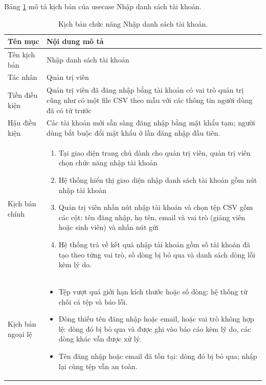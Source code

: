 \documentclass[../BTL.tex]{subfiles}
\begin{document}
Bảng \ref{tab:uc-import-users} mô tả kịch bản của usecase Nhập danh sách tài khoản.
\begin{table}[H]
\centering
\begin{tabularx}{\textwidth}{|p{3.2cm}|X|}
\hline
Tên mục & Nội dung mô tả \\ \hline
Tên kịch bản & Nhập danh sách tài khoản \\ \hline
Tác nhân & Quản trị viên \\ \hline
Tiền điều kiện & Quản trị viên đã đăng nhập bằng tài khoản có vai trò quản trị cũng như có một file CSV theo mẫu với các thông tin người dùng đã có từ trước \\ \hline
Hậu điều kiện & Các tài khoản mới sẵn sàng đăng nhập bằng mật khẩu tạm; người dùng bắt buộc đổi mật khẩu ở lần đăng nhập đầu tiên. \\ \hline
Kịch bản chính &
\begin{enumerate}[leftmargin=*, nosep]
    \item Tại giao diện trang chủ dành cho quản trị viên, quản trị viên chọn chức năng nhập tài khoản
    \item Hệ thống hiển thị giao diện nhập danh sách tài khoản gồm nút nhập tài khoản
    \item Quản trị viên nhấn nút nhập tài khoản và chọn tệp CSV gồm các cột: tên đăng nhập, họ tên, email và vai trò (giảng viên hoặc sinh viên) và nhấn nút gửi
    \item Hệ thống trả về kết quả nhập tài khoản gồm số tài khoản đã tạo theo từng vai trò, số dòng bị bỏ qua và danh sách dòng lỗi kèm lý do.
\end{enumerate} \\ \hline
Kịch bản ngoại lệ &
\begin{itemize}[leftmargin=*, nosep]
    \item Tệp vượt quá giới hạn kích thước hoặc số dòng: hệ thống từ chối cả tệp và báo lỗi.
    \item Dòng thiếu tên đăng nhập hoặc email, hoặc vai trò không hợp lệ: dòng đó bị bỏ qua và được ghi vào báo cáo kèm lý do, các dòng khác vẫn được xử lý.
    \item Tên đăng nhập hoặc email đã tồn tại: dòng đó bị bỏ qua; nhập lại cùng tệp vẫn an toàn.
\end{itemize} \\ \hline
\end{tabularx}
\caption{Kịch bản chức năng Nhập danh sách tài khoản.}
\label{tab:uc-import-users}
\end{table}
\end{document}
